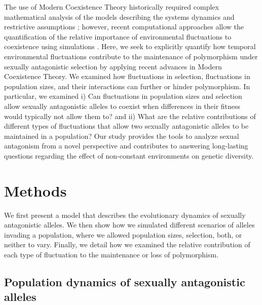 \documentclass[12pt]{article}
\begin{document}
The use of Modern Coexistence Theory historically required complex mathematical analysis of the models describing the systems dynamics and restrictive assumptions \citep{barabas_chessons_2018}; however, recent computational approaches allow the quantification of the relative importance of environmental fluctuations to coexistence using simulations \citep{ellner2016quantify,ellner_expanded_2019,shoemaker2020}. Here, we seek to explicitly quantify how temporal environmental fluctuations contribute to the maintenance of polymorphism under sexually antagonistic selection by applying recent advances in Modern Coexistence Theory.  We examined how fluctuations in selection, fluctuations in population sizes, and their interactions can further or hinder polymorphism. In particular, we examined i) Can fluctuations in population sizes and selection allow sexually antagonistic alleles to coexist when differences in their fitness would typically not allow them to? and ii) What are the relative contributions of different types of fluctuations that allow two sexually antagonistic alleles to be maintained in a population? Our study provides the tools to analyze sexual antagonism from a novel perspective and contributes to answering long-lasting questions regarding the effect of non-constant environments on genetic diversity.


\section{Methods}

We first present a model that describes the evolutionary dynamics of sexually antagonistic alleles. We then show how we simulated different scenarios of alleles invading a population, where we allowed population sizes, selection, both, or neither to vary. Finally, we detail how we examined the relative contribution of each type of fluctuation to the maintenance or loss of polymorphism.

\subsection*{Population dynamics of sexually antagonistic alleles}
\end{document}

